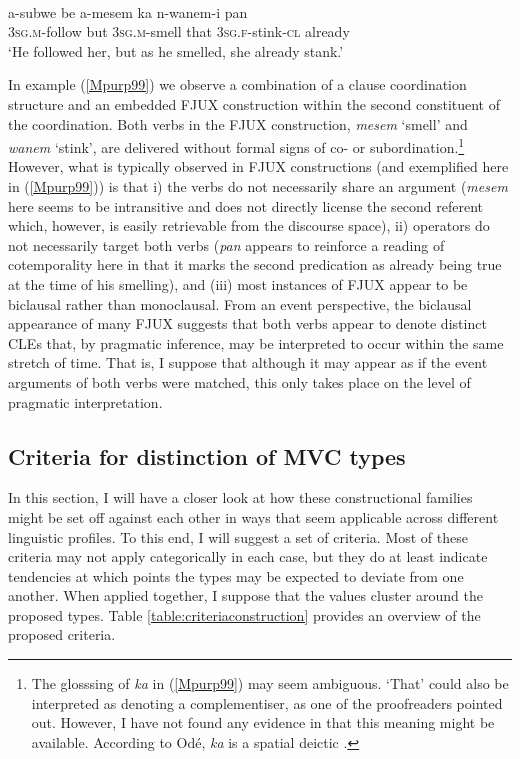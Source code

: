\ea \label{Mpurp99}
\\
\gll a-subwe be a-mesem ka n-wanem-i pan \\
\textsc{3}\textsc{sg}.\textsc{m}-follow but \textsc{3}\textsc{sg}.\textsc{m}-smell that \textsc{3}\textsc{sg}.\textsc{f}-stink-\textsc{cl} already \\
\glft `He followed her, but as he smelled, she already stank.' \\ 
\z

In example (\ref{Mpurp99}) we observe a combination of a clause coordination structure and an embedded FJUX construction within the second constituent of the coordination. Both verbs in the FJUX construction, \textit{mesem} `smell' and \textit{wanem} `stink', are delivered without formal signs of co- or subordination.\footnote{The glosssing of \textit{ka} in (\ref{Mpurp99}) may seem ambiguous. `That' could also be interpreted as denoting a complementiser, as one of the proofreaders pointed out. However, I have not found any evidence in \citet{ode2002sketch} that this meaning might be available. According to Odé, \textit{ka} is a spatial deictic \citep[64]{ode2002sketch}.} However, what is typically observed in FJUX constructions (and exemplified here in (\ref{Mpurp99})) is that i) the verbs do not necessarily share an argument (\textit{mesem} here seems to be intransitive and does not directly license the second referent which, however, is easily retrievable from the discourse space), ii) operators do not necessarily target both verbs (\textit{pan} appears to reinforce a reading of cotemporality here in that it marks the second predication as already being true at the time of his smelling), and (iii) most instances of FJUX appear to be biclausal rather than monoclausal. From an event perspective, the biclausal appearance of many FJUX suggests that both verbs appear to denote distinct CLEs that, by pragmatic inference, may be interpreted to occur within the same stretch of time. That is, I suppose that although it may appear as if the event arguments of both verbs were matched, this only takes place on the level of pragmatic interpretation.

\subsection{Criteria for distinction of MVC types}\label{sec:criteria_mvcs}

In this section, I will have a closer look at how these constructional families might be set off against each other in ways that seem applicable across different linguistic profiles. To this end, I will suggest a set of criteria. Most of these criteria may not apply categorically in each case, but they do at least indicate tendencies at which points the types may be expected to deviate from one another. When applied together, I suppose that the values cluster around the proposed types. Table \ref{table:criteriaconstruction} provides an overview of the proposed criteria.

